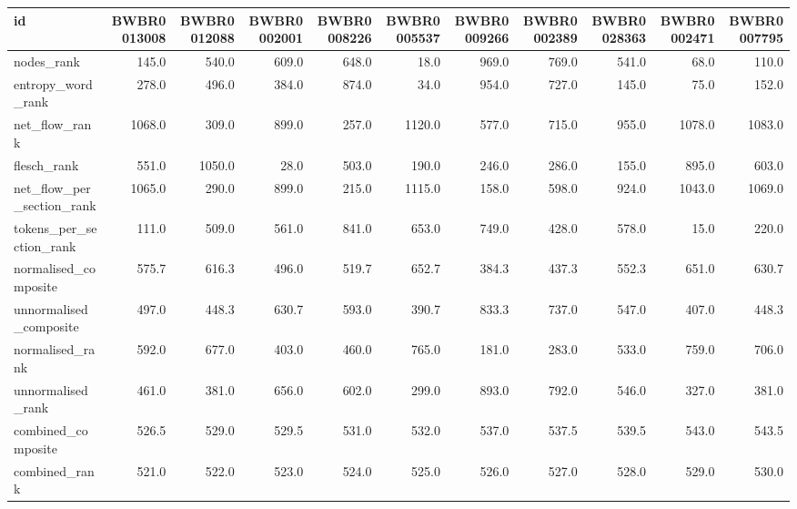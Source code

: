 \begin{tabular}{lrrrrrrrrrr}
\toprule
id & BWBR0013008 & BWBR0012088 & BWBR0002001 & BWBR0008226 & BWBR0005537 & BWBR0009266 & BWBR0002389 & BWBR0028363 & BWBR0002471 & BWBR0007795 \\
\midrule
nodes\_rank & 145.0 & 540.0 & 609.0 & 648.0 & 18.0 & 969.0 & 769.0 & 541.0 & 68.0 & 110.0 \\
\cline{1-11}
entropy\_word\_rank & 278.0 & 496.0 & 384.0 & 874.0 & 34.0 & 954.0 & 727.0 & 145.0 & 75.0 & 152.0 \\
\cline{1-11}
net\_flow\_rank & 1068.0 & 309.0 & 899.0 & 257.0 & 1120.0 & 577.0 & 715.0 & 955.0 & 1078.0 & 1083.0 \\
\cline{1-11}
flesch\_rank & 551.0 & 1050.0 & 28.0 & 503.0 & 190.0 & 246.0 & 286.0 & 155.0 & 895.0 & 603.0 \\
\cline{1-11}
net\_flow\_per\_section\_rank & 1065.0 & 290.0 & 899.0 & 215.0 & 1115.0 & 158.0 & 598.0 & 924.0 & 1043.0 & 1069.0 \\
\cline{1-11}
tokens\_per\_section\_rank & 111.0 & 509.0 & 561.0 & 841.0 & 653.0 & 749.0 & 428.0 & 578.0 & 15.0 & 220.0 \\
\cline{1-11}
normalised\_composite & 575.7 & 616.3 & 496.0 & 519.7 & 652.7 & 384.3 & 437.3 & 552.3 & 651.0 & 630.7 \\
\cline{1-11}
unnormalised\_composite & 497.0 & 448.3 & 630.7 & 593.0 & 390.7 & 833.3 & 737.0 & 547.0 & 407.0 & 448.3 \\
\cline{1-11}
normalised\_rank & 592.0 & 677.0 & 403.0 & 460.0 & 765.0 & 181.0 & 283.0 & 533.0 & 759.0 & 706.0 \\
\cline{1-11}
unnormalised\_rank & 461.0 & 381.0 & 656.0 & 602.0 & 299.0 & 893.0 & 792.0 & 546.0 & 327.0 & 381.0 \\
\cline{1-11}
combined\_composite & 526.5 & 529.0 & 529.5 & 531.0 & 532.0 & 537.0 & 537.5 & 539.5 & 543.0 & 543.5 \\
\cline{1-11}
combined\_rank & 521.0 & 522.0 & 523.0 & 524.0 & 525.0 & 526.0 & 527.0 & 528.0 & 529.0 & 530.0 \\
\cline{1-11}
\bottomrule
\end{tabular}

